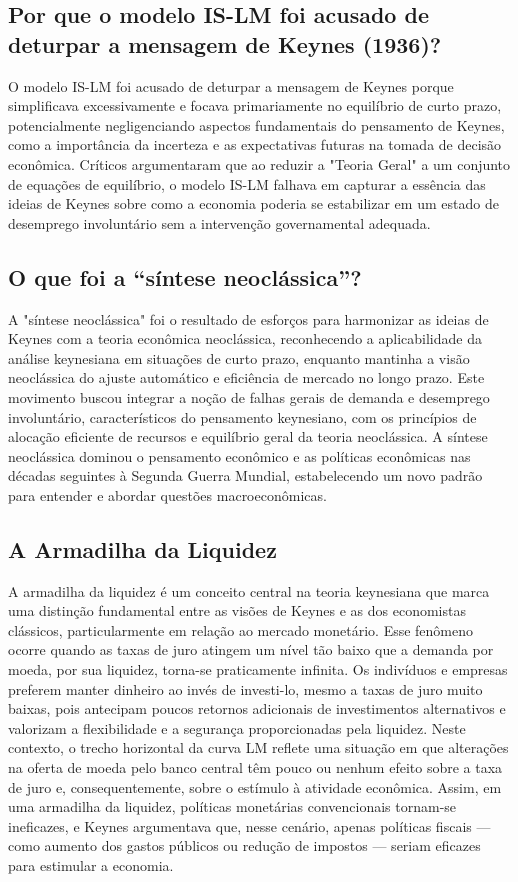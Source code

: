 \documentclass[a4paper,12pt]{article}[abntex2]
\begin{document}
\subsection{\textbf{Por que o modelo IS-LM foi acusado de deturpar a mensagem de Keynes (1936)?}}
O modelo IS-LM foi acusado de deturpar a mensagem de Keynes porque simplificava excessivamente e focava primariamente no equilíbrio de curto prazo, potencialmente negligenciando aspectos fundamentais do pensamento de Keynes, como a importância da incerteza e as expectativas futuras na tomada de decisão econômica. Críticos argumentaram que ao reduzir a "Teoria Geral" a um conjunto de equações de equilíbrio, o modelo IS-LM falhava em capturar a essência das ideias de Keynes sobre como a economia poderia se estabilizar em um estado de desemprego involuntário sem a intervenção governamental adequada.
\subsection{\textbf{O que foi a “síntese neoclássica”?}}
A "síntese neoclássica" foi o resultado de esforços para harmonizar as ideias de Keynes com a teoria econômica neoclássica, reconhecendo a aplicabilidade da análise keynesiana em situações de curto prazo, enquanto mantinha a visão neoclássica do ajuste automático e eficiência de mercado no longo prazo. Este movimento buscou integrar a noção de falhas gerais de demanda e desemprego involuntário, característicos do pensamento keynesiano, com os princípios de alocação eficiente de recursos e equilíbrio geral da teoria neoclássica. A síntese neoclássica dominou o pensamento econômico e as políticas econômicas nas décadas seguintes à Segunda Guerra Mundial, estabelecendo um novo padrão para entender e abordar questões macroeconômicas.
\subsection{\textbf{A Armadilha da Liquidez}}
A armadilha da liquidez é um conceito central na teoria keynesiana que marca uma distinção fundamental entre as visões de Keynes e as dos economistas clássicos, particularmente em relação ao mercado monetário. Esse fenômeno ocorre quando as taxas de juro atingem um nível tão baixo que a demanda por moeda, por sua liquidez, torna-se praticamente infinita. Os indivíduos e empresas preferem manter dinheiro ao invés de investi-lo, mesmo a taxas de juro muito baixas, pois antecipam poucos retornos adicionais de investimentos alternativos e valorizam a flexibilidade e a segurança proporcionadas pela liquidez. Neste contexto, o trecho horizontal da curva LM reflete uma situação em que alterações na oferta de moeda pelo banco central têm pouco ou nenhum efeito sobre a taxa de juro e, consequentemente, sobre o estímulo à atividade econômica. Assim, em uma armadilha da liquidez, políticas monetárias convencionais tornam-se ineficazes, e Keynes argumentava que, nesse cenário, apenas políticas fiscais — como aumento dos gastos públicos ou redução de impostos — seriam eficazes para estimular a economia.
\end{document}
